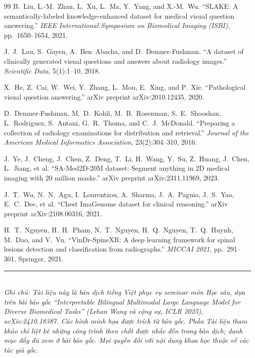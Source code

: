 \documentclass[12pt,a4paper,oneside]{extarticle}
\begin{document}
\begin{thebibliography}{99}
 B.~Liu, L.-M.~Zhan, L.~Xu, L.~Ma, Y.~Yang, and X.-M.~Wu.
``SLAKE: A semantically-labeled knowledge-enhanced dataset for medical visual question answering.''
\textit{IEEE International Symposium on Biomedical Imaging (ISBI)}, pp.~1650--1654, 2021.

 J.~J.~Lau, S.~Gayen, A.~Ben~Abacha, and D.~Demner-Fushman.
``A dataset of clinically generated visual questions and answers about radiology images.''
\textit{Scientific Data}, 5(1):1--10, 2018.

 X.~He, Z.~Cai, W.~Wei, Y.~Zhang, L.~Mou, E.~Xing, and P.~Xie.
``Pathological visual question answering.'' arXiv preprint arXiv:2010.12435, 2020.

 D.~Demner-Fushman, M.~D.~Kohli, M.~B.~Rosenman, S.~E.~Shooshan, L.~Rodriguez,
S.~Antani, G.~R.~Thoma, and C.~J.~McDonald. ``Preparing a collection of radiology examinations
for distribution and retrieval.'' \textit{Journal of the American Medical Informatics Association},
23(2):304--310, 2016.

 J.~Ye, J.~Cheng, J.~Chen, Z.~Deng, T.~Li, H.~Wang, Y.~Su, Z.~Huang, J.~Chen,
L.~Jiang, et al. ``SA-Med2D-20M dataset: Segment anything in 2D medical imaging with 20 million
masks.'' arXiv preprint arXiv:2311.11969, 2023.

 J.~T.~Wu, N.~N.~Agu, I.~Lourentzou, A.~Sharma, J.~A.~Paguio, J.~S.~Yao,
E.~C.~Dee, et al. ``Chest ImaGenome dataset for clinical reasoning.''
arXiv preprint arXiv:2108.00316, 2021.

 H.~T.~Nguyen, H.~H.~Pham, N.~T.~Nguyen, H.~Q.~Nguyen, T.~Q.~Huynh, M.~Dao,
and V.~Vu. ``VinDr-SpineXR: A deep learning framework for spinal lesions detection and
classification from radiographs.'' \textit{MICCAI 2021}, pp.~291--301, Springer, 2021.

\end{thebibliography}

\vspace{0.8cm}
\noindent\rule{\textwidth}{0.4pt}\\[4pt]
\textit{\small Ghi chú: Tài liệu này là bản dịch tiếng Việt phục vụ seminar môn Học sâu, dựa trên
bài báo gốc ``Interpretable Bilingual Multimodal Large Language Model for Diverse Biomedical
Tasks'' (Lehan Wang và cộng sự, ICLR 2025), arXiv:2410.18387. Các hình minh họa được trích từ bản
gốc. Phần Tài liệu tham khảo chỉ liệt kê những công trình then chốt được nhắc đến trong bản dịch;
danh mục đầy đủ xem ở bài báo gốc. Mọi quyền đối với nội dung khoa học thuộc về các tác giả gốc.}
\end{document}
